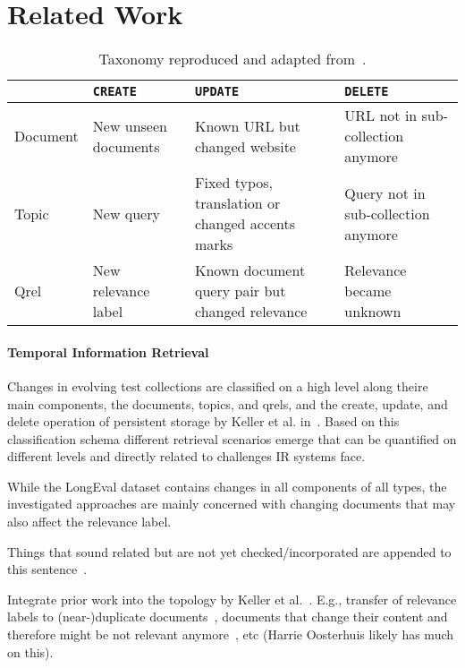 \section{Related Work}


\begin{table}
    \caption{Taxonomy reproduced and adapted from~\cite{keller:2024}.}
    \label{tab:CRUD}
    \begin{tabularx}{\linewidth}{l | X | X | X}
        \toprule
        {}       & \texttt{CREATE}          & \texttt{UPDATE}                 & \texttt{DELETE} \\ \midrule
        Document & New unseen documents     & Known URL but changed website   & URL not in sub-collection anymore              \\\midrule
        Topic    & New query                & Fixed typos, translation or changed accents marks                               & Query not in sub-collection anymore \\\midrule
        Qrel     & New relevance label      & Known document query pair but changed relevance & Relevance became unknown   \\\bottomrule
    \end{tabularx}
\end{table}

\paragraph{Temporal Information Retrieval}

Changes in evolving test collections are classified on a high level along theire main components, the documents, topics, and qrels, and the create, update, and delete operation of persistent storage by Keller et al. in~\cite{keller:2024}. Based on this classification schema different retrieval scenarios emerge that can be quantified on different levels and directly related to challenges IR systems face.


While the LongEval dataset contains changes in all components of all types, the investigated approaches are mainly concerned with changing documents that may also affect the relevance label.



Things that sound related but are not yet checked/incorporated are appended to this sentence~\cite{li:2022}.

Integrate prior work into the topology by Keller et al.~\cite{keller:2024}. E.g., transfer of relevance labels to (near-)duplicate documents~\cite{froebe:2021a}, documents that change their content and therefore might be not relevant anymore~\cite{froebe:2022d}, etc (Harrie Oosterhuis likely has much on this).



